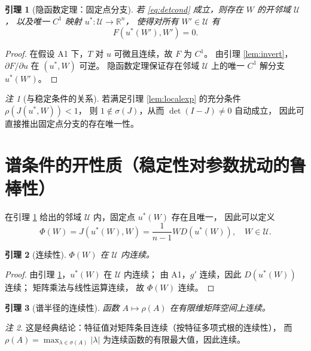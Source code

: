 \documentclass[11pt]{article}
\theoremstyle{plain}
\newtheorem{lemma}{引理}
\theoremstyle{remark}
\newtheorem{remark}{注}
\begin{document}
\begin{lemma}[隐函数定理：固定点分支]\label{lem:IFT}
若 \eqref{eq:detcond} 成立，则存在 $W$ 的开邻域 $\mathcal U$，
以及唯一 $C^1$ 映射 $u^*:\mathcal U\to\mathbb R^n$，
使得对所有 $W'\in\mathcal U$ 有
\[
F(u^*(W'),W')=0.
\]
\end{lemma}

\begin{proof}
在假设 A1 下，$T$ 对 $u$ 可微且连续，故 $F$ 为 $C^1$。
由引理 \ref{lem:invert}，$\partial F/\partial u$ 在 $(u^*,W)$ 可逆。
隐函数定理保证存在邻域 $\mathcal U$ 上的唯一 $C^1$ 解分支 $u^*(W')$。
\end{proof}

\begin{remark}[与稳定条件的关系]
若满足引理 \ref{lem:localexp} 的充分条件 $\rho(J(u^*,W))<1$，
则 $1\notin\sigma(J)$，从而 $\det(I-J)\neq 0$ 自动成立，
因此可直接推出固定点分支的存在唯一性。
\end{remark}

\section{谱条件的开性质（稳定性对参数扰动的鲁棒性）}

在引理 \ref{lem:IFT} 给出的邻域 $\mathcal U$ 内，固定点 $u^*(W)$ 存在且唯一，
因此可以定义
\begin{equation}\label{eq:Phi}
\Phi(W)=J(u^*(W),W)
=\frac{1}{n-1}W D(u^*(W)),\quad W\in\mathcal U.
\end{equation}

\begin{lemma}[连续性]\label{lem:contPhi}
$\Phi(W)$ 在 $\mathcal U$ 内连续。
\end{lemma}

\begin{proof}
由引理 \ref{lem:IFT}，$u^*(W)$ 在 $\mathcal U$ 内连续；
由 A1，$g'$ 连续，因此 $D(u^*(W))$ 连续；
矩阵乘法与线性运算连续，
故 $\Phi(W)$ 连续。
\end{proof}

\begin{lemma}[谱半径的连续性]\label{lem:contRho}
函数 $A\mapsto \rho(A)$ 在有限维矩阵空间上连续。
\end{lemma}

\begin{remark}
这是经典结论：特征值对矩阵条目连续（按特征多项式根的连续性），
而 $\rho(A)=\max_{\lambda\in\sigma(A)}|\lambda|$ 为连续函数的有限最大值，因此连续。
\end{remark}
\end{document}
